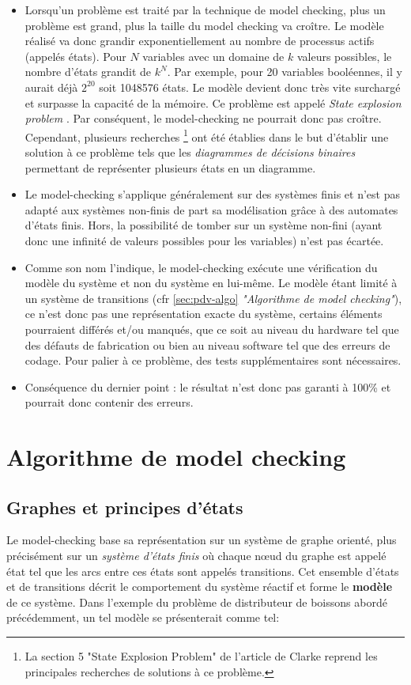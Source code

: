 \documentclass[runningheads,a4paper,10pt]{llncs}
\begin{document}
\begin{itemize}
\item Lorsqu'un problème est traité par la technique de model checking, plus un problème est grand, plus la taille du model checking va croître. Le modèle réalisé va donc grandir exponentiellement au nombre de processus actifs (appelés états). Pour $N$ variables avec un domaine de $k$ valeurs possibles, le nombre d'états grandit de $k^{N}$. Par exemple, pour 20 variables booléennes, il y aurait déjà $2^{20}$ soit 1048576 états. Le modèle devient donc très vite surchargé et surpasse la capacité de la mémoire. Ce problème est appelé \textit{State explosion problem} \cite{StateExpProb}. Par conséquent, le model-checking ne pourrait donc pas croître. Cependant, plusieurs recherches \footnote{La section 5 "State Explosion Problem" de l'article de Clarke \cite{StateExpProb} reprend les principales recherches de solutions à ce problème.} ont été établies dans le but d'établir une solution à ce problème tels que les \textit{diagrammes de décisions binaires} permettant de représenter plusieurs états en un diagramme. 
\item Le model-checking s'applique généralement sur des systèmes finis et n'est pas adapté aux systèmes non-finis de part sa modélisation grâce à des automates d'états finis. Hors, la possibilité de tomber sur un système non-fini (ayant donc une infinité de valeurs possibles pour les variables) n'est pas écartée. 
\item Comme son nom l'indique, le model-checking exécute une vérification du modèle du système et non du système en lui-même. Le modèle étant limité à un système de transitions (cfr \autoref{sec:pdv-algo} \textit{"Algorithme de model checking"}), ce n'est donc pas une représentation exacte du système, certains éléments pourraient différés et/ou manqués, que ce soit au niveau du hardware tel que des défauts de fabrication ou bien au niveau software tel que des erreurs de codage. Pour palier à ce problème, des tests supplémentaires sont nécessaires. 
\item Conséquence du dernier point : le résultat n'est donc pas garanti à 100\% et pourrait donc contenir des erreurs. 
\end{itemize}

\section{Algorithme de model checking} \label{sec:pdv-algo}

\subsection{Graphes et principes d'états}
Le model-checking base sa représentation sur un système de graphe orienté, plus précisément sur un \textit{système d'états finis} où chaque n\oe ud du graphe est appelé état tel que les arcs entre ces états sont appelés transitions. Cet ensemble d'états et de transitions décrit le comportement du système réactif et forme le \textbf{modèle} de ce système. Dans l'exemple du problème de distributeur de boissons abordé précédemment, un tel modèle se présenterait comme tel: 
\end{document}
